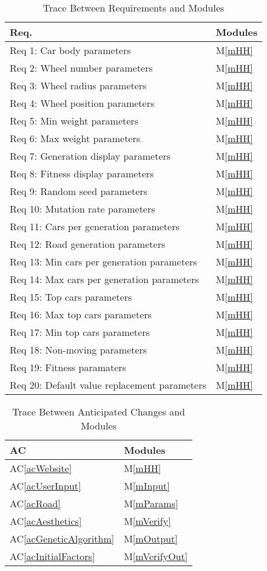 \documentclass[12pt, titlepage]{article}
\newcommand{\acref}[1]{AC\ref{#1}}
\newcommand{\mref}[1]{M\ref{#1}}
\begin{document}
\begin{table}[H]
\centering
\begin{tabular}{p{} p{}}
\toprule
\textbf{Req.} & \textbf{Modules}\\
\midrule
Req 1: Car body parameters & \mref{mHH}\\
Req 2: Wheel number parameters & \mref{mHH}\\
Req 3: Wheel radius parameters & \mref{mHH}\\
Req 4: Wheel position parameters & \mref{mHH}\\
Req 5: Min weight parameters & \mref{mHH}\\
Req 6: Max weight parameters & \mref{mHH}\\
Req 7: Generation display parameters & \mref{mHH}\\
Req 8: Fitness display parameters & \mref{mHH}\\
Req 9: Random seed parameters & \mref{mHH}\\
Req 10: Mutation rate parameters & \mref{mHH}\\
Req 11: Cars per generation parameters &\mref{mHH}\\ 
Req 12: Road generation parameters & \mref{mHH}\\
Req 13: Min cars per generation parameters & \mref{mHH}\\
Req 14: Max cars per generation parameters & \mref{mHH}\\
Req 15: Top cars parameters & \mref{mHH}\\
Req 16: Max top cars parameters & \mref{mHH}\\
Req 17: Min top cars parameters & \mref{mHH}\\
Req 18: Non-moving parameters & \mref{mHH}\\
Req 19: Fitness paramaters & \mref{mHH}\\
Req 20: Default value replacement parameters & \mref{mHH}\\

\bottomrule
\end{tabular}
\caption{Trace Between Requirements and Modules}
\label{TblRT}
\end{table}

\begin{table}[H]
\centering
\begin{tabular}{p{} p{}}
\toprule
\textbf{AC} & \textbf{Modules}\\
\midrule
\acref{acWebsite} & \mref{mHH}\\
\acref{acUserInput} & \mref{mInput}\\
\acref{acRoad} & \mref{mParams}\\
\acref{acAesthetics} & \mref{mVerify}\\
\acref{acGeneticAlgorithm} & \mref{mOutput}\\
\acref{acInitialFactors} & \mref{mVerifyOut}\\
\bottomrule
\end{tabular}
\caption{Trace Between Anticipated Changes and Modules}
\label{TblACT}
\end{table}
\end{document}
